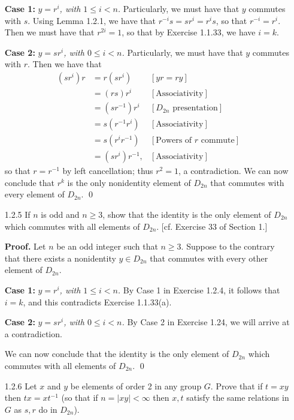 \begin{enumerate}
      \textbf{Case 1:} \textit{$y = r^i$, with $1 \le i < n$.} Particularly, we
      must have that $y$ commutes with $s$. Using Lemma 1.2.1, we have that
      $r^{-i}s = sr^i = r^is$, so that $r^{-i} = r^i$. Then we must have that
      $r^{2i} = 1$, so that by Exercise 1.1.33, we have $i = k$.
      
      \textbf{Case 2:} \textit{$y = sr^i$, with $0 \le i < n$.} Particularly, we
      must have that $y$ commutes with $r$. Then we have that
      \begin{align*}
         (sr^i)r &= r(sr^i) &[yr = ry] \\
                 &= (rs)r^i &[\text{Associativity}] \\
                 &= (sr^{-1})r^i &[D_{2n}\text{ presentation}] \\
                 &= s(r^{-1}r^i) &[\text{Associativity}] \\
                 &= s(r^ir^{-1}) &[\text{Powers of $r$ commute}] \\
                 &= (sr^i)r^{-1}, &[\text{Associativity}]
      \end{align*}
      so that $r = r^{-1}$ by left cancellation; thus $r^2 = 1$, a
      contradiction. We can now conclude that $r^k$ is the only nonidentity
      element of $D_{2n}$ that commutes with every element of $D_{2n}$. \qed
   \item[1.2.5]   If $n$ is odd and $n \ge 3$, show that the identity is the
                  only element of $D_{2n}$ which commutes with all elements of
                  $D_{2n}$. [cf. Exercise 33 of Section 1.]

      \textbf{Proof.} Let $n$ be an odd integer such that $n \ge 3$. Suppose to
      the contrary that there exists a nonidentity $y \in D_{2n}$ that commutes
      with every other element of $D_{2n}$.
      
      \textbf{Case 1:} \textit{$y = r^i$, with $1 \le i < n$.} By Case 1 in
      Exercise 1.2.4, it follows that $i = k$, and this contradicts
      Exercise 1.1.33(a).
      
      
      \textbf{Case 2:} \textit{$y = sr^i$, with $0 \le i < n$.} By Case 2 in
      Exercise 1.24, we will arrive at a contradiction.

      We can now conclude that the identity is the only element of $D_{2n}$ 
      which commutes with all elements of $D_{2n}$. \qed

   \item[1.2.6]   Let $x$ and $y$ be elements of order 2 in any group $G$. Prove
                  that if $t = xy$ then $tx = xt^{-1}$ (so that if
                  $n = |xy| < \infty$ then $x, t$ satisfy the same relations in
                  $G$ as $s, r$ do in $D_{2n}$).


\end{enumerate}

